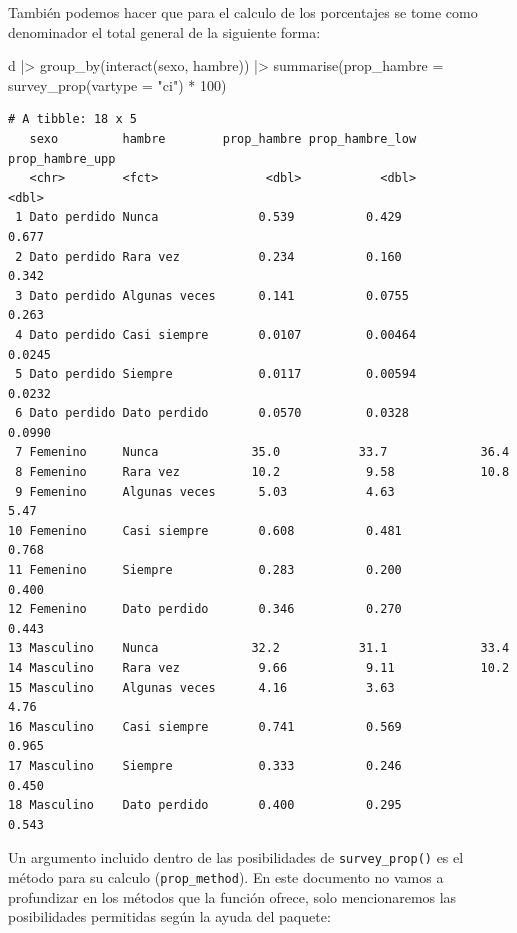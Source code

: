 \documentclass[
  spanish,
  a4paper,
]{scrbook}
\newenvironment{Shaded}{\begin{snugshade}}{\end{snugshade}}
\newcommand{\AttributeTok}[1]{\textcolor[rgb]{0.40,0.45,0.13}{#1}}
\newcommand{\DecValTok}[1]{\textcolor[rgb]{0.68,0.00,0.00}{#1}}
\newcommand{\FunctionTok}[1]{\textcolor[rgb]{0.28,0.35,0.67}{#1}}
\newcommand{\NormalTok}[1]{\textcolor[rgb]{0.00,0.23,0.31}{#1}}
\newcommand{\SpecialCharTok}[1]{\textcolor[rgb]{0.37,0.37,0.37}{#1}}
\newcommand{\StringTok}[1]{\textcolor[rgb]{0.13,0.47,0.30}{#1}}
\begin{document}
También podemos hacer que para el calculo de los porcentajes se tome
como denominador el total general de la siguiente forma:

\begin{Shaded}
\begin{Highlighting}[]
\NormalTok{d }\SpecialCharTok{|\textgreater{}}
  \FunctionTok{group\_by}\NormalTok{(}\FunctionTok{interact}\NormalTok{(sexo, hambre)) }\SpecialCharTok{|\textgreater{}}
  \FunctionTok{summarise}\NormalTok{(}\AttributeTok{prop\_hambre =} \FunctionTok{survey\_prop}\NormalTok{(}\AttributeTok{vartype =} \StringTok{"ci"}\NormalTok{) }\SpecialCharTok{*} \DecValTok{100}\NormalTok{)}
\end{Highlighting}
\end{Shaded}

\begin{verbatim}
# A tibble: 18 x 5
   sexo         hambre        prop_hambre prop_hambre_low prop_hambre_upp
   <chr>        <fct>               <dbl>           <dbl>           <dbl>
 1 Dato perdido Nunca              0.539          0.429            0.677 
 2 Dato perdido Rara vez           0.234          0.160            0.342 
 3 Dato perdido Algunas veces      0.141          0.0755           0.263 
 4 Dato perdido Casi siempre       0.0107         0.00464          0.0245
 5 Dato perdido Siempre            0.0117         0.00594          0.0232
 6 Dato perdido Dato perdido       0.0570         0.0328           0.0990
 7 Femenino     Nunca             35.0           33.7             36.4   
 8 Femenino     Rara vez          10.2            9.58            10.8   
 9 Femenino     Algunas veces      5.03           4.63             5.47  
10 Femenino     Casi siempre       0.608          0.481            0.768 
11 Femenino     Siempre            0.283          0.200            0.400 
12 Femenino     Dato perdido       0.346          0.270            0.443 
13 Masculino    Nunca             32.2           31.1             33.4   
14 Masculino    Rara vez           9.66           9.11            10.2   
15 Masculino    Algunas veces      4.16           3.63             4.76  
16 Masculino    Casi siempre       0.741          0.569            0.965 
17 Masculino    Siempre            0.333          0.246            0.450 
18 Masculino    Dato perdido       0.400          0.295            0.543 
\end{verbatim}

Un argumento incluido dentro de las posibilidades de
\texttt{survey\_prop()} es el método para su calculo
(\texttt{prop\_method}). En este documento no vamos a profundizar en los
métodos que la función ofrece, solo mencionaremos las posibilidades
permitidas según la ayuda del paquete:
\end{document}
